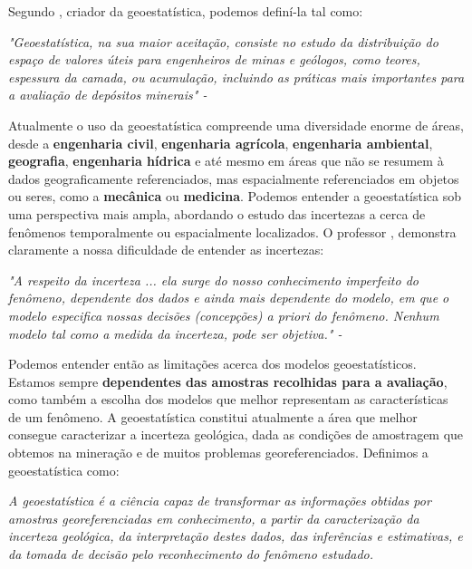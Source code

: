  Segundo \citet{matheron1963principles}, criador da geoestatística, podemos definí-la tal como:
 
 \FloatBarrier
 \begin{remark}	
 	\textit{"Geoestatística, na sua maior aceitação, consiste no estudo da distribuição do espaço de valores úteis para engenheiros de minas e geólogos, como teores, espessura da camada, ou acumulação, incluindo as práticas mais importantes para a avaliação de depósitos minerais" - \cite{matheron1963principles}} 
 \end{remark}
\FloatBarrier

Atualmente o uso da geoestatística compreende uma diversidade enorme de áreas, desde a \textbf{engenharia civil}, \textbf{engenharia agrícola}, \textbf{engenharia ambiental}, \textbf{geografia}, \textbf{engenharia hídrica} e até mesmo em áreas que não se resumem à dados geograficamente referenciados, mas espacialmente referenciados em objetos ou seres, como a \textbf{mecânica} ou \textbf{medicina}. Podemos entender a geoestatística sob uma perspectiva mais ampla, abordando o estudo das incertezas a cerca de fenômenos temporalmente ou espacialmente localizados. O professor \citet{goovaerts1997geostatistics}, demonstra claramente a nossa dificuldade de entender as incertezas:

 \FloatBarrier
\begin{remark}	
	\textit{"A respeito da incerteza ... ela surge do nosso conhecimento imperfeito do fenômeno, dependente dos dados e ainda mais dependente do modelo, em que o modelo especifica nossas decisões (concepções) a priori do fenômeno. Nenhum modelo tal como a medida da incerteza, pode ser objetiva." - \cite{goovaerts1997geostatistics}} 
\end{remark}
\FloatBarrier

Podemos entender então as limitações acerca dos modelos geoestatísticos. Estamos sempre \textbf{dependentes das amostras recolhidas para a avaliação}, como também a escolha dos modelos que melhor representam as características de um fenômeno. A geoestatística constitui atualmente a área que melhor consegue caracterizar a incerteza geológica, dada as condições de amostragem que obtemos na mineração e de muitos problemas georeferenciados.  Definimos a geoestatística como:

\begin{definition} [Geoestatística]
	\textit{A geoestatística é a ciência capaz de transformar as informações obtidas por amostras georeferenciadas em conhecimento, a partir da caracterização da incerteza geológica, da interpretação destes dados, das inferências e estimativas, e da tomada de decisão pelo reconhecimento do fenômeno estudado.}
\end{definition}

